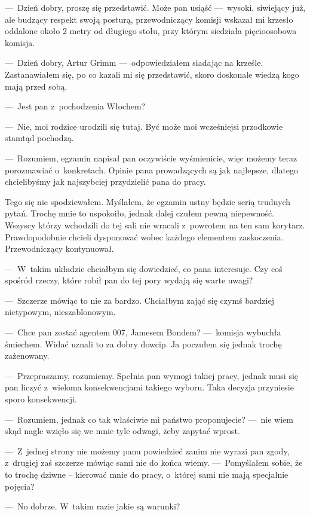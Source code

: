 ---~Dzień dobry, proszę się przedstawić. Może pan usiąść ---~wysoki, siwiejący już, ale budzący respekt swoją 
posturą, przewodniczący komisji wskazał mi krzesło oddalone około 2 metry od długiego stołu, przy którym siedziała 
pięcioosobowa komisja. 

---~Dzień dobry, Artur Grimm ---~odpowiedziałem siadając na krześle. Zastanawiałem się, po co kazali mi się 
przedstawić, skoro doskonale wiedzą kogo mają przed sobą. 

---~Jest pan z~pochodzenia Włochem? 

---~Nie, moi rodzice urodzili się tutaj. Być może moi wcześniejsi przodkowie stamtąd pochodzą. 

---~Rozumiem, egzamin napisał pan oczywiście wyśmienicie, więc możemy teraz porozmawiać o~konkretach. Opinie pana 
prowadzących są jak najlepsze, dlatego chcielibyśmy jak najszybciej przydzielić pana do pracy.

Tego się nie spodziewałem. Myślałem, że egzamin ustny będzie serią trudnych pytań. Trochę mnie to uspokoiło, jednak 
dalej czułem pewną niepewność. Wszyscy którzy wchodzili do tej sali nie wracali z~powrotem  na ten sam korytarz. 
Prawdopodobnie chcieli dysponować wobec każdego elementem zaskoczenia. Przewodniczący kontynuował. 

---~W~takim układzie chciałbym się dowiedzieć, co pana interesuje. Czy coś spośród rzeczy, które robił pan do tej 
pory wydają się warte uwagi? 

---~Szczerze mówiąc to nie za bardzo. Chciałbym zająć się czymś bardziej nietypowym, nieszablonowym. 

---~Chce pan zostać agentem 007, Jamesem Bondem? ---~komisja wybuchła śmiechem. Widać uznali to za dobry dowcip. Ja 
poczułem się jednak trochę zażenowany. 

---~Przepraszamy, rozumiemy. Spełnia pan wymogi takiej pracy, jednak musi się pan liczyć z~wieloma konsekwencjami 
takiego wyboru. Taka decyzja przyniesie sporo konsekwencji. 

---~Rozumiem, jednak co tak właściwie mi państwo proponujecie? ---~nie wiem skąd nagle wzięło się we mnie tyle 
odwagi, żeby zapytać wprost. 

---~Z~jednej strony nie możemy panu powiedzieć zanim nie wyrazi pan zgody, z~drugiej zaś szczerze mówiąc sami nie do 
końca wiemy. ---~Pomyślałem sobie, że to trochę dziwne -- kierować mnie do pracy, o~której sami nie mają specjalnie 
pojęcia? 

---~No dobrze. W~takim razie jakie są warunki? 

